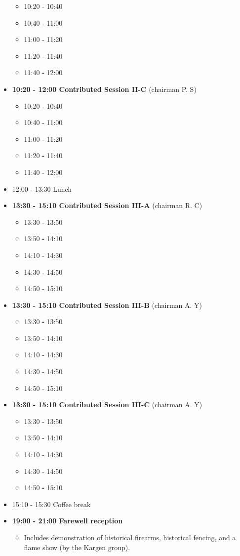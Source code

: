 \documentclass[10pt, A4]{article}%
\begin{document}
\begin{itemize}
  \begin{itemize}
    \item 10:20 - 10:40 
    \item 10:40 - 11:00 
    \item 11:00 - 11:20 
    \item 11:20 - 11:40 
    \item 11:40 - 12:00 
  \end{itemize}
    \item {\bf 10:20 - 12:00 Contributed Session II-C} (chairman P. S) 
  \begin{itemize}
    \item 10:20 - 10:40 
    \item 10:40 - 11:00 
    \item 11:00 - 11:20 
    \item 11:20 - 11:40 
    \item 11:40 - 12:00 
  \end{itemize}
  \item 12:00 - 13:30 Lunch
  \item {\bf 13:30 - 15:10 Contributed Session III-A} (chairman R. C) 
  \begin{itemize}
    \item 13:30 - 13:50 
    \item 13:50 - 14:10 
    \item 14:10 - 14:30 
    \item 14:30 - 14:50
    \item 14:50 - 15:10 
  \end{itemize}
  \item {\bf 13:30 - 15:10 Contributed Session III-B} (chairman A. Y) 
  \begin{itemize}
    \item 13:30 - 13:50 
    \item 13:50 - 14:10 
    \item 14:10 - 14:30 
    \item 14:30 - 14:50
    \item 14:50 - 15:10  
  \end{itemize}
    \item {\bf 13:30 - 15:10 Contributed Session III-C} (chairman A. Y) 
  \begin{itemize}
    \item 13:30 - 13:50 
    \item 13:50 - 14:10 
    \item 14:10 - 14:30 
    \item 14:30 - 14:50
    \item 14:50 - 15:10 
  \end{itemize}
  \item 15:10 - 15:30 Coffee break
  \item {\bf 19:00 - 21:00 Farewell reception}
    \begin{itemize}
     \item Includes demonstration of historical firearms, historical fencing, and a flame show (by the Kargen group).
  \end{itemize} 
\end{itemize}
\end{document}
